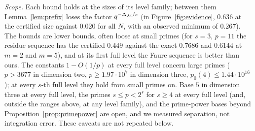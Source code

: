 \emph{Scope.} Each bound holds at the sizes of its level family; between them Lemma~\ref{lem:prefix} loses the factor $q^{-\Delta_{\mathcal{M}}/s}$ (in Figure~\ref{fig:evidence}, $0.636$ at the certified size against $0.020$ for all $N$, with an observed minimum of $0.267$). The bounds are lower bounds, often loose at small primes (for $s=3$, $p=11$ the residue sequence has the certified $0.449$ against the exact $0.7686$ and $0.6144$ at $m=2$ and $m=5$), and at its first full level the Faure sequence is better than ours. The constants $1-O(1/p)$ at every full level concern large primes ($p>3677$ in dimension two, $p\ge1.97\cdot10^7$ in dimension three, $p_0(4)\le1.44\cdot10^{16}$); at every $s$-th full level they hold from small primes on. Base $5$ in dimension three at every full level, the primes $s\le p<2^s$ for $s\ge4$ at every full level (and, outside the ranges above, at any level family), and the prime-power bases beyond Proposition~\ref{prop:primepower} are open, and we measured separation, not integration error. These caveats are not repeated below.

